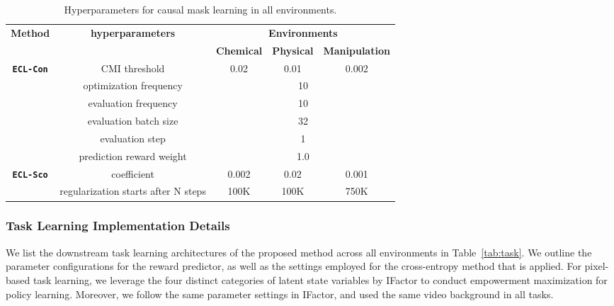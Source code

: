 \begin{table}[h]
\caption{Hyperparameters for causal mask learning in all environments.}
\label{tab:dyn}
\renewcommand{\arraystretch}{1.3}
\setlength{\tabcolsep}{7pt} %
\centering
\begin{tabular}{ccccc}
\hline
\multirow{2}{*}{\textbf{Method}}  & \multirow{2}{*}{\textbf{hyperparameters}}             & \multicolumn{3}{c}{\textbf{Environments}}   \\ \cline{3-5} 
                         &                                              & \textbf{Chemical} & \textbf{Physical} & \textbf{Manipulation} \\ \hline
\multirow{6}{*}{\texttt{\textbf{ECL-Con}}} & CMI threshold                                & 0.02     & 0.01     & 0.002        \\
                         & optimization frequency                       & \multicolumn{3}{c}{10}             \\
                         & evaluation frequency                         & \multicolumn{3}{c}{10}             \\
                         & evaluation batch size                        & \multicolumn{3}{c}{32}             \\
                         & evaluation step                              & \multicolumn{3}{c}{1}              \\
                         & prediction reward weight                     & \multicolumn{3}{c}{1.0}            \\ \hline
\multirow{2}{*}{\texttt{\textbf{ECL-Sco}}} & coefficient                                  & 0.002    & 0.02     & 0.001        \\
                         & regularization starts after N steps & 100K     & 100K     & 750K         \\ \hline
\end{tabular}
\end{table}

\subsubsection{Task Learning Implementation Details}
\label{sec:pixel_setting}
We list the downstream task learning architectures of the proposed method across all environments in Table~\ref{tab:task}. We outline the parameter configurations for the reward predictor, as well as the settings employed for the cross-entropy method that is applied. 
For pixel-based task learning, we leverage the four distinct categories of latent state variables by IFactor to conduct empowerment maximization for policy learning. 
Moreover, we follow the same parameter settings in IFactor, and used the same video background in all tasks. 

